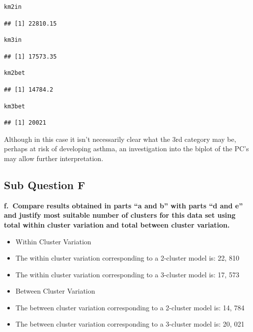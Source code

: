 \documentclass[
]{article}
\providecommand{\tightlist}{%
  \setlength{\itemsep}{0pt}\setlength{\parskip}{0pt}}
\begin{document}
\begin{lstlisting}[language=R]
  km2in
\end{lstlisting}

\begin{lstlisting}
## [1] 22810.15
\end{lstlisting}

\begin{lstlisting}[language=R]
  km3in
\end{lstlisting}

\begin{lstlisting}
## [1] 17573.35
\end{lstlisting}

\begin{lstlisting}[language=R]
  km2bet
\end{lstlisting}

\begin{lstlisting}
## [1] 14784.2
\end{lstlisting}

\begin{lstlisting}[language=R]
  km3bet
\end{lstlisting}

\begin{lstlisting}
## [1] 20021
\end{lstlisting}

Although in this case it isn't necessarily clear what the 3rd category
may be, perhaps at risk of developing asthma, an investigation into the
biplot of the PC's may allow further interpretation.

\hypertarget{sub-question-f}{%
\subsection{Sub Question F}\label{sub-question-f}}

\textbf{f.~Compare results obtained in parts ``a and b'' with parts ``d
and e'' and justify most suitable number of clusters for this data set
using total within cluster variation and total between cluster
variation.}

\begin{itemize}
\tightlist
\item
  Within Cluster Variation
\item
  The within cluster variation corresponding to a 2-cluster model is:
  22, 810
\item
  The within cluster variation corresponding to a 3-cluster model is:
  17, 573
\item
  Between Cluster Variation
\item
  The between cluster variation corresponding to a 2-cluster model is:
  14, 784
\item
  The between cluster variation corresponding to a 3-cluster model is:
  20, 021
\end{itemize}
\end{document}
